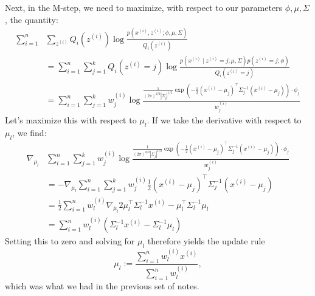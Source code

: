 Next, in the M-step, we need to maximize, with respect to our parameters
$\phi,\mu,\Sigma$, the quantity:
\begin{align*}
    \sum_{i=1}^n &\sum_{z^{(i)}}Q_i(z^{(i)}) \log \frac{p(x^{(i)} ,z^{(i)} ;\phi,\mu,\Sigma)}{Q_i(z^{(i)})}\\
        &= \sum_{i=1}^n \sum_{j=1}^k Q_i (z^{(i)} = j) \log\frac{p(x^{(i)} \mid z^{(i)} = j;\mu,\Sigma)p(z^{(i)} = j;\phi)}{Q_i (z^{(i)} = j)}\\
        &= \sum_{i=1}^n \sum_{j=1}^k w^{(i)}_j \log\frac{\frac{1}{(2\pi)^{d/2} |\Sigma_j|^{1/2}} \exp\left(- \frac 1 2 (x^{(i)} - \mu_j )^\top \Sigma^{-1}_j (x^{(i)} - \mu_j ) \right) \cdot \phi_j}{w^{(i)}_j}    
\end{align*}
Let's maximize this with respect to $\mu_l$. If we take the derivative with respect
to $\mu_l$, we find:
\begin{align*}
    \nabla_{\mu_l} &\sum_{i=1}^n \sum_{j=1}^k w^{(i)}_j \log\frac{\frac{1}{(2\pi)^{d/2} |\Sigma_j|^{1/2}}\exp \left( -\frac{1}{2} (x^{(i)} - \mu_j)^\top \Sigma^{-1}_j (x^{(i)} - \mu_j) \right) \cdot \phi_j}{w^{(i)}_j}\\
        &= -\nabla_{\mu_l} \sum_{i=1}^n \sum_{j=1}^k w^{(i)}_j \frac 1 2 (x^{(i)} - \mu_j )^\top \Sigma^{-1}_j (x^{(i)} - \mu_j)\\
        &=\frac{1}{2} \sum_{i=1}^n w^{(i)}_l \nabla_{\mu_l} 2\mu^\top_l \Sigma^{-1}_l x^{(i)} - \mu^\top_l \Sigma^{-1}_l \mu_l\\
        &= \sum_{i=1}^n w^{(i)}_l \left( \Sigma^{-1}_l x^{(i)} - \Sigma^{-1}_l \mu_l \right)
\end{align*}
Setting this to zero and solving for $\mu_l$ therefore yields the update rule
\begin{equation*}
    \mu_l := \frac{\sum^n_{i=1} w^{(i)}_l x^{(i)}}{\sum^n_{i=1} w^{(i)}_l},
\end{equation*}
which was what we had in the previous set of notes.

